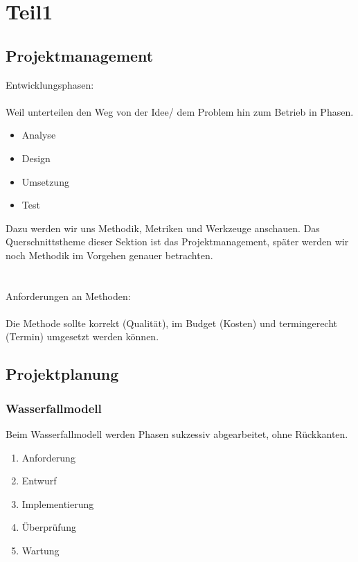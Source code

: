 \section{Teil1}

\subsection{Projektmanagement}

Entwicklungsphasen:\\
\\
Weil unterteilen den Weg von der Idee/ dem Problem hin zum Betrieb in Phasen.

\begin{itemize}
    \item Analyse
    \item Design
    \item Umsetzung
    \item Test
\end{itemize}

Dazu werden wir uns Methodik, Metriken und Werkzeuge anschauen.
Das Querschnittstheme dieser Sektion ist das Projektmanagement, später werden wir noch Methodik im Vorgehen genauer 
betrachten.\\
\\ \\
Anforderungen an Methoden:\\
\\
Die Methode sollte korrekt (Qualität), im Budget (Kosten) und termingerecht (Termin) umgesetzt werden können.

\subsection{Projektplanung}

\subsubsection{Wasserfallmodell}

Beim Wasserfallmodell werden Phasen sukzessiv abgearbeitet, ohne Rückkanten.
\begin{enumerate}
    \item Anforderung
    \item Entwurf
    \item Implementierung
    \item Überprüfung
    \item Wartung
\end{enumerate}

